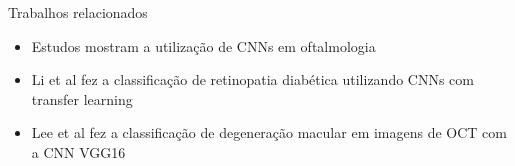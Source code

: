 \documentclass{beamer}
\begin{document}
\begin{frame}{Trabalhos relacionados}
    \begin{itemize}
        \item Estudos mostram a utilização de CNNs em oftalmologia
        \item Li et al fez a classificação de retinopatia diabética utilizando CNNs com transfer learning 
        \item Lee et al fez a classificação de degeneração macular em imagens de OCT com a CNN VGG16 
    \end{itemize}
    
\end{frame}
\end{document}
